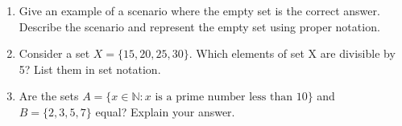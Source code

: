\documentclass{article}
\begin{document}
\begin{enumerate}
    \item Give an example of a scenario where the empty set is the correct answer. Describe the scenario and represent the empty set using proper notation.\\[1em]

    \item Consider a set \( X = \{ 15, 20, 25, 30 \} \). Which elements of set X are divisible by 5? List them in set notation.\\[1em]

    \item Are the sets \( A = \{ x \in \mathbb{N} : x \text{ is a prime number less than } 10 \} \) and \( B = \{ 2, 3, 5, 7 \} \) equal? Explain your answer.\\[1em]


\end{enumerate}
\end{document}
